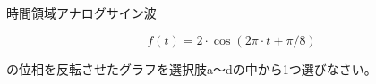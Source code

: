 時間領域アナログサイン波

\[
f(t) = 2 \cdot \cos( 2\pi \cdot t + \pi/8 )
\]

\bigskip
\noindent  の位相を反転させたグラフを選択肢a〜dの中から1つ選びなさい。
